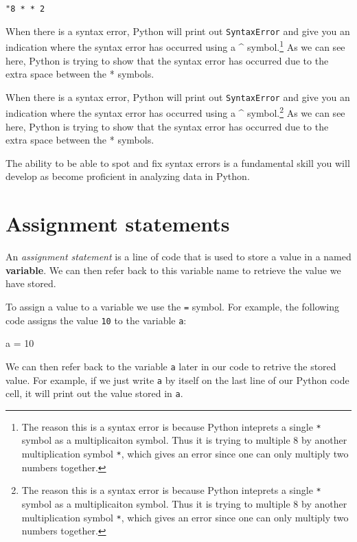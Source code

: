 \documentclass[
  letterpaper,
  DIV=11,
  numbers=noendperiod]{scrreprt}
\newenvironment{Shaded}{\begin{snugshade}}{\end{snugshade}}
\newcommand{\DecValTok}[1]{\textcolor[rgb]{0.68,0.00,0.00}{#1}}
\newcommand{\NormalTok}[1]{\textcolor[rgb]{0.00,0.23,0.31}{#1}}
\newcommand{\OperatorTok}[1]{\textcolor[rgb]{0.37,0.37,0.37}{#1}}
\begin{document}
\texttt{"8\ *\ *\ 2}

When there is a syntax error, Python will print out \texttt{SyntaxError}
and give you an indication where the syntax error has occurred using a
\^{} symbol.\footnote{The reason this is a syntax error is because
  Python inteprets a single \texttt{*} symbol as a multiplicaiton
  symbol. Thus it is trying to multiple 8 by another multiplication
  symbol \texttt{*}, which gives an error since one can only multiply
  two numbers together.} As we can see here, Python is trying to show
that the syntax error has occurred due to the extra space between the *
symbols.

When there is a syntax error, Python will print out \texttt{SyntaxError}
and give you an indication where the syntax error has occurred using a
\^{} symbol.\footnote{The reason this is a syntax error is because
  Python inteprets a single \texttt{*} symbol as a multiplicaiton
  symbol. Thus it is trying to multiple 8 by another multiplication
  symbol \texttt{*}, which gives an error since one can only multiply
  two numbers together.} As we can see here, Python is trying to show
that the syntax error has occurred due to the extra space between the *
symbols.

The ability to be able to spot and fix syntax errors is a fundamental
skill you will develop as become proficient in analyzing data in Python.

\section{Assignment statements}\label{assignment-statements}

An \emph{assignment statement} is a line of code that is used to store a
value in a named \textbf{variable}. We can then refer back to this
variable name to retrieve the value we have stored.

To assign a value to a variable we use the \texttt{=} symbol. For
example, the following code assigns the value \texttt{10} to the
variable \texttt{a}:

\begin{Shaded}
\begin{Highlighting}[]
\NormalTok{a }\OperatorTok{=} \DecValTok{10}
\end{Highlighting}
\end{Shaded}

We can then refer back to the variable \texttt{a} later in our code to
retrive the stored value. For example, if we just write \texttt{a} by
itself on the last line of our Python code cell, it will print out the
value stored in \texttt{a}.
\end{document}
